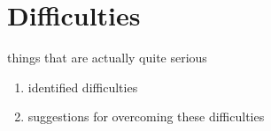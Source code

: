 \documentclass[11pt,a4paper,]{article}
\providecommand{\tightlist}{%
  \setlength{\itemsep}{0pt}\setlength{\parskip}{0pt}}
\begin{document}
\hypertarget{difficulties}{%
\section{Difficulties}\label{difficulties}}

things that are actually quite serious

\begin{enumerate}
\def\labelenumi{\arabic{enumi}.}
\tightlist
\item
  identified difficulties
\item
  suggestions for overcoming these difficulties
\end{enumerate}

\printbibliography[title=References]
\end{document}
